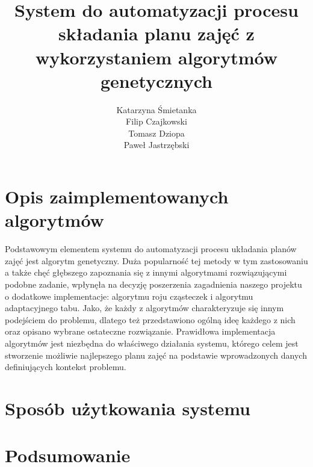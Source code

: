 \documentclass[11pt]{report}
\title{System do automatyzacji procesu składania planu zajęć z wykorzystaniem algorytmów genetycznych}
\author{
	Katarzyna Śmietanka \\
	Filip Czajkowski \\
	Tomasz Dziopa\\
	Paweł Jastrzębski
}
\begin{document}
%
%

\maketitle
\tableofcontents









\chapter{Opis zaimplementowanych algorytmów}
\label{algorytmy}
\par Podstawowym elementem systemu do automatyzacji procesu układania planów zajęć jest algorytm genetyczny. Duża popularność tej metody w tym zastosowaniu a także chęć głębszego zapoznania się z innymi algorytmami rozwiązującymi podobne zadanie, wpłynęła na decyzję poszerzenia zagadnienia naszego projektu o dodatkowe implementacje: algorytmu roju cząsteczek i algorytmu adaptacyjnego tabu. 
Jako, że każdy z algorytmów charakteryzuje się innym podejściem do problemu, dlatego też przedstawiono ogólną ideę każdego z nich oraz opisano wybrane ostateczne rozwiązanie. Prawidłowa implementacja algorytmów jest niezbędna do właściwego działania systemu, którego celem jest stworzenie możliwie najlepszego planu zajęć na podstawie wprowadzonych danych definiujących kontekst problemu.








\chapter{Sposób użytkowania systemu}

\chapter{Podsumowanie}

\end{document}

